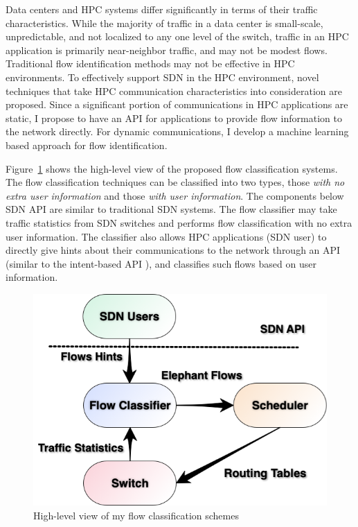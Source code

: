 Data centers and HPC systems differ significantly in terms of their traffic characteristics. While the majority of traffic in a data center is small-scale, unpredictable, and not localized to any one level of the switch, traffic in an HPC application is primarily near-neighbor traffic, and may not be modest flows. Traditional flow identification methods may not be effective
in HPC environments. To effectively support SDN in the HPC environment,
novel techniques that take HPC communication characteristics into
consideration are proposed. Since a significant portion of
communications in HPC applications are static, I propose to have an API for
applications to provide flow information to the network directly. For
dynamic communications, I develop a machine learning based approach for
flow identification.

Figure~\ref{fig:flow_schemes} shows the high-level view of the proposed
flow classification systems. The flow classification techniques can
be classified into two types, those {\em with no extra user information} and
those {\em with user information}. The components below SDN API are similar to
traditional SDN systems. The flow classifier may take traffic statistics from
SDN switches and performs flow classification with no extra user information.
The classifier also allows HPC applications (SDN user) to directly give
hints about their communications to the network through an API
(similar to the intent-based API \cite{Coflow2012}), and classifies
such flows based on user information.

\begin{figure}[h]
\centering
    \includegraphics[width=0.8\columnwidth]{figs/Fig3.png}
\caption{High-level view of my flow classification schemes}
  \label{fig:flow_schemes}
\end{figure}

